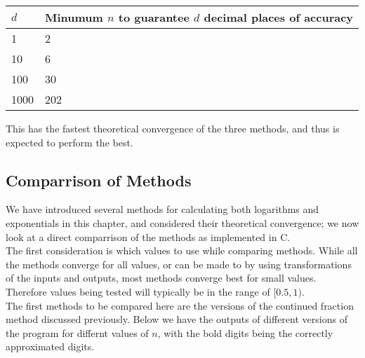 \begin{center}
\begin{tabular}{|l|l|}
\hline
\(d\) & Minumum \(n\) to guarantee \(d\) decimal places of accuracy\\\hline
1 & 2 \\\hline
10 & 6 \\\hline
100 & 30 \\\hline
1000 & 202 \\\hline
\end{tabular}
\end{center}

This has the fastest theoretical convergence of the three methods, and thus is expected to perform the best.

\subsection{Comparrison of Methods}

We have introduced several methods for calculating both logarithms and exponentials in this chapter, and considered their theoretical convergence; we now look at a direct comparrison of the methods as implemented in C.\\

The first consideration is which values to use while comparing methods. While all the methods converge for all values, or can be made to by using transformations of the inputs and outputs, most methods converge best for small values. Therefore values being tested will typically be in the range of \([0.5, 1)\).\\

The first methods to be compared here are the versions of the continued fraction method discussed previously. Below we have the outputs of different versions of the program for differnt values of \(n\), with the bold digits being the correctly approximated digits.


